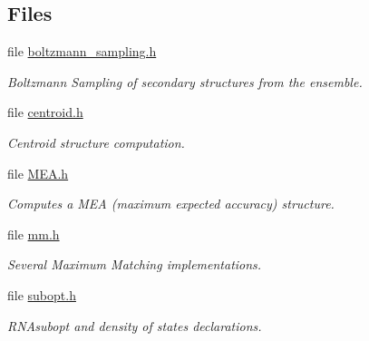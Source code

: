 \subsection*{Files}
\begin{DoxyCompactItemize}
\item 
file \mbox{\hyperlink{boltzmann__sampling_8h}{boltzmann\+\_\+sampling.\+h}}
\begin{DoxyCompactList}\small\item\em Boltzmann Sampling of secondary structures from the ensemble. \end{DoxyCompactList}\item 
file \mbox{\hyperlink{centroid_8h}{centroid.\+h}}
\begin{DoxyCompactList}\small\item\em Centroid structure computation. \end{DoxyCompactList}\item 
file \mbox{\hyperlink{MEA_8h}{M\+E\+A.\+h}}
\begin{DoxyCompactList}\small\item\em Computes a M\+EA (maximum expected accuracy) structure. \end{DoxyCompactList}\item 
file \mbox{\hyperlink{mm_8h}{mm.\+h}}
\begin{DoxyCompactList}\small\item\em Several Maximum Matching implementations. \end{DoxyCompactList}\item 
file \mbox{\hyperlink{subopt_8h}{subopt.\+h}}
\begin{DoxyCompactList}\small\item\em R\+N\+Asubopt and density of states declarations. \end{DoxyCompactList}\end{DoxyCompactItemize}
